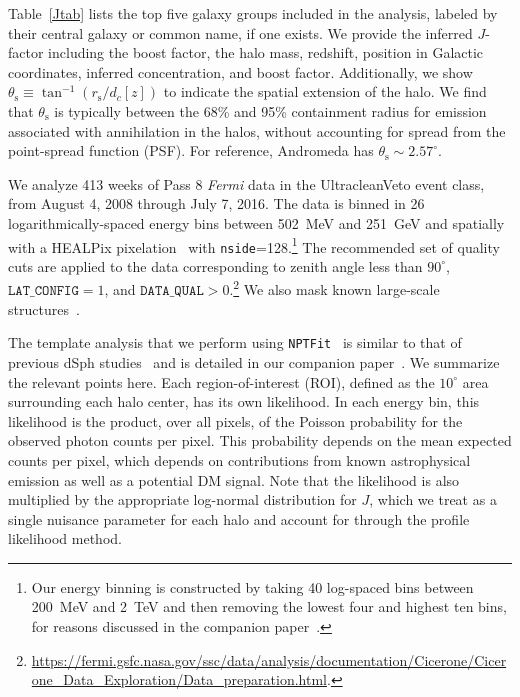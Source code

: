 Table~\ref{Jtab} lists the top five galaxy groups included in the analysis, labeled by their central galaxy or common name, if one exists.  We provide the inferred $J$-factor including the boost factor, the halo mass, redshift, position in Galactic coordinates, inferred concentration, and boost factor.  Additionally, we show $\theta_\text{s} \equiv \tan^{-1} (r_\text{s} / d_c[z])$ to indicate the spatial extension of the halo.  We find that $\theta_\text{s}$ is typically between the 68\% and 95\% containment radius for emission associated with annihilation in the halos, without accounting for spread from the point-spread function (PSF).  For reference, Andromeda has $\theta_\text{s} \sim 2.57^\circ$.  

  We analyze 413 weeks of Pass 8 {\it Fermi} data in the UltracleanVeto event class, from August 4, 2008 through July 7, 2016.  The data is binned in 26 logarithmically-spaced energy bins between 502~MeV and 251~GeV and spatially with a HEALPix pixelation~\cite{Gorski:2004by} with \texttt{nside}=128.\footnote{Our energy binning is constructed by taking 40 log-spaced bins between 200~MeV and 2~TeV and then removing the lowest four and highest ten bins, for reasons discussed in the companion paper~\cite{companion}. }  The recommended set of quality cuts are applied to the data corresponding to zenith angle less than $90^\circ$, $\texttt{LAT\_CONFIG}=1$, and $\texttt{DATA\_QUAL}>0$.\footnote{\url{https://fermi.gsfc.nasa.gov/ssc/data/analysis/documentation/Cicerone/Cicerone_Data_Exploration/Data_preparation.html}.}  We also mask known large-scale structures~\cite{companion}.

The template analysis that we perform using \texttt{NPTFit}~\cite{Mishra-Sharma:2016gis} is similar to that of previous dSph studies~\cite{Ackermann:2015zua,Fermi-LAT:2016uux}  and is detailed in our companion paper~\cite{companion}.  We summarize the relevant points here.  Each region-of-interest (ROI), defined as the $10^\circ$ area surrounding each halo center, has its own likelihood.  In each energy bin, this  likelihood is the product, over all pixels, of the Poisson probability for the observed photon counts per pixel.  This probability depends on the mean expected counts per pixel, which depends on contributions from known astrophysical emission as well as a potential DM signal. Note that the likelihood is also multiplied by the appropriate log-normal distribution for $J$, which we treat as a single nuisance parameter for each halo and account for through the profile likelihood method.  

